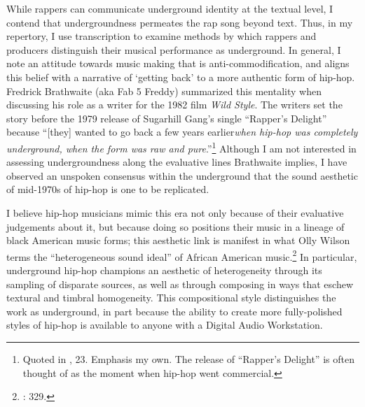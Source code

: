 While rappers can communicate underground identity at the textual level, I contend that undergroundness permeates the rap song beyond text. Thus, in my repertory, I use transcription to examine methods by which rappers and producers distinguish their musical performance as underground. In general, I note an attitude towards music making that is anti-commodification, and aligns this belief with a narrative of `getting back' to a more authentic form of hip-hop. Fredrick Brathwaite (aka Fab 5 Freddy) summarized this mentality when discussing his role as a writer for the 1982 film \textit{Wild Style}. The writers set the story before the 1979 release of Sugarhill Gang's single ``Rapper's Delight'' because ``[they] wanted to go back a few years earlier\textellipsis \emph{when hip-hop was completely underground, when the form was raw and pure}.''\footnote{Quoted in \cite{justinawilliamsRhyminStealinMusical2013}, 23. Emphasis my own. The release of ``Rapper's Delight'' is often thought of as the moment when hip-hop went commercial.} Although I am not interested in assessing undergroundness along the evaluative lines Brathwaite implies, I have observed an unspoken consensus within the underground that the sound aesthetic of mid-1970s of hip-hop is one to be replicated.

I believe hip-hop musicians mimic this era not only because of their evaluative judgements about it, but because doing so positions their music in a lineage of black American music forms; this aesthetic link is manifest in what Olly Wilson terms the ``heterogeneous sound ideal'' of African American music.\footnote{\cite{ollywilsonHeterogeneousSoundIdeal1992}: 329.} In particular, underground hip-hop champions an aesthetic of heterogeneity through its sampling of disparate sources, as well as  through composing in ways that eschew textural and timbral homogeneity. This compositional style distinguishes the work as underground, in part because the ability to create more fully-polished styles of hip-hop is available to anyone with a Digital Audio Workstation. 

